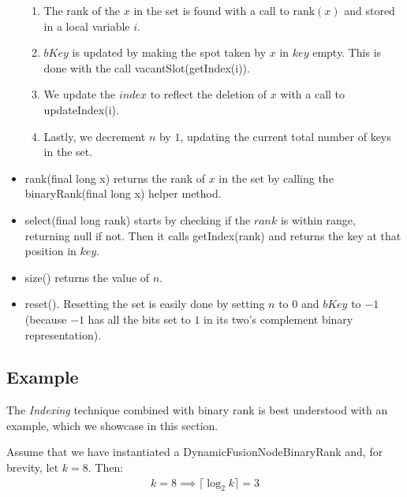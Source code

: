 \begin{itemize}
\begin{enumerate}
        \item
        The rank of the $x$ in the set is found with a call to $\text{rank}(x)$ and stored in a local variable $i$.
        
        \item
        $bKey$ is updated by making the spot taken by $x$ in $key$ empty. This is done with the call {\ttfamily vacantSlot(getIndex(i))}.
        
        \item
        We update the $index$ to reflect the deletion of $x$ with a call to {\ttfamily updateIndex(i)}.
        
        \item
        Lastly, we decrement $n$ by $1$, updating the current total number of keys in the set.
    \end{enumerate}
    
    \item
    {\ttfamily rank(final long x)} returns the rank of $x$ in the set by calling the {\ttfamily binaryRank(final long x)} helper method.
    
    \item
    {\ttfamily select(final long rank)} starts by checking if the $rank$ is within range, returning {\ttfamily null} if not. Then it calls {\ttfamily getIndex(rank)} and returns the key at that position in $key$.
    
    \item
    {\ttfamily size()} returns the value of $n$.
    
    \item
    {\ttfamily reset()}.
    Resetting the set is easily done by setting $n$ to $0$ and $bKey$ to $-1$ (because $-1$ has all the bits set to $1$ in its two's complement binary representation).
\end{itemize}

\subsection{Example}

The \textit{Indexing} technique combined with binary rank is best understood with an example, which we showcase in this section.


Assume that we have instantiated a {\ttfamily DynamicFusionNodeBinaryRank} and, for brevity, let $k = 8$. Then:
\begin{align*}
    k = 8 \implies \lceil \log_2 k \rceil = 3
\end{align*}

